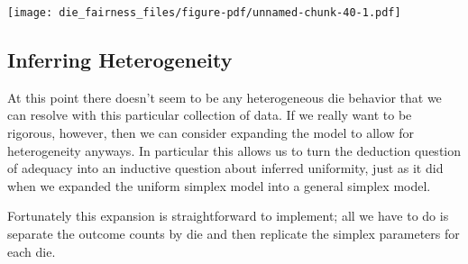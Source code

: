 \documentclass[
  letterpaper,
  DIV=11,
  numbers=noendperiod]{scrartcl}
\newenvironment{Shaded}{\begin{snugshade}}{\end{snugshade}}
\newcommand{\AttributeTok}[1]{\textcolor[rgb]{0.40,0.45,0.13}{#1}}
\newcommand{\DecValTok}[1]{\textcolor[rgb]{0.68,0.00,0.00}{#1}}
\newcommand{\FunctionTok}[1]{\textcolor[rgb]{0.28,0.35,0.67}{#1}}
\newcommand{\NormalTok}[1]{\textcolor[rgb]{0.00,0.23,0.31}{#1}}
\newcommand{\SpecialCharTok}[1]{\textcolor[rgb]{0.37,0.37,0.37}{#1}}
\newcommand{\StringTok}[1]{\textcolor[rgb]{0.13,0.47,0.30}{#1}}
\begin{document}
\begin{Shaded}
\end{Shaded}

\texttt{[image: die\_fairness\_files/figure-pdf/unnamed-chunk-40-1.pdf]}

\subsection{Inferring Heterogeneity}\label{inferring-heterogeneity}

At this point there doesn't seem to be any heterogeneous die behavior
that we can resolve with this particular collection of data. If we
really want to be rigorous, however, then we can consider expanding the
model to allow for heterogeneity anyways. In particular this allows us
to turn the deduction question of adequacy into an inductive question
about inferred uniformity, just as it did when we expanded the uniform
simplex model into a general simplex model.

Fortunately this expansion is straightforward to implement; all we have
to do is separate the outcome counts by die and then replicate the
simplex parameters for each die.
\end{document}

